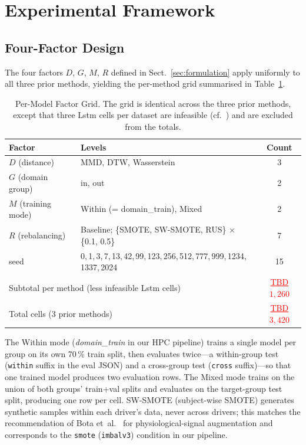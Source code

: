 \documentclass[lettersize,journal]{IEEEtran}
\newcommand{\TBD}[1]{\textcolor{red}{\underline{TBD#1}}}
\begin{document}
\section{Experimental Framework}
\label{sec:framework}

\subsection{Four-Factor Design}\label{sec:design_overview}
The four factors $D$, $G$, $M$, $R$ defined in Sect.~\ref{sec:formulation} apply uniformly to all three prior methods, yielding the per-method grid summarised in Table~\ref{tab:grid_per_model}.
\begin{table}[!t]
\caption{Per-Model Factor Grid. The grid is identical across the three prior methods, except that three Lstm cells per dataset are infeasible (cf.~\cite{nakagama2025imbalv3issue15}) and are excluded from the totals.\label{tab:grid_per_model}}
\centering
\begin{tabular}{|l|l|c|}
\hline
Factor & Levels & Count \\
\hline
$D$ (distance) & MMD, DTW, Wasserstein & 3 \\
\hline
$G$ (domain group) & in, out & 2 \\
\hline
$M$ (training mode) & Within (= domain\_train), Mixed & 2 \\
\hline
$R$ (rebalancing) & Baseline; \{SMOTE, SW-SMOTE, RUS\} $\times$ \{0.1, 0.5\} & 7 \\
\hline
seed & 0,\,1,\,3,\,7,\,13,\,42,\,99,\,123,\,256,\,512,\,777,\,999,\,1234,\,1337,\,2024 & 15 \\
\hline
\multicolumn{2}{|l|}{Subtotal per method (less infeasible Lstm cells)} & \TBD{$1{,}260$}\\
\hline
\multicolumn{2}{|l|}{Total cells (3 prior methods)} & \TBD{$3{,}420$} \\
\hline
\end{tabular}
\end{table}

The Within mode (\textit{domain\_train} in our HPC pipeline) trains a single model per group on its own 70\,\% train split, then evaluates twice---a within-group test (\texttt{within} suffix in the eval JSON) and a cross-group test (\texttt{cross} suffix)---so that one trained model produces two evaluation rows.
The Mixed mode trains on the union of both groups' train+val splits and evaluates on the target-group test split, producing one row per cell.
SW-SMOTE (subject-wise SMOTE) generates synthetic samples within each driver's data, never across drivers; this matches the recommendation of Bota et~al.~\cite{bota2024} for physiological-signal augmentation and corresponds to the \texttt{smote} (\texttt{imbalv3}) condition in our pipeline.
\end{document}
